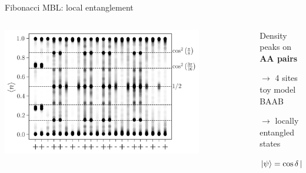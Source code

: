 \begin{frame}{Fibonacci MBL: local entanglement}
\begin{columns}
\begin{column}{0.5\textwidth}
\centering
\includegraphics[width=0.8\textwidth]{img/3_Fibonacci/realspace_sz_L22_h5_shift1}
\end{column}
\begin{column}{0.5\textwidth}
Density peaks on \textbf{AA pairs}

$\to$ 4 sites toy model BAAB

$\to$ locally entangled states

$\ket{\psi} = \cos \delta \ket{01} \pm \sin \delta \ket{10}$


\end{column}
\end{columns}
\end{frame}

